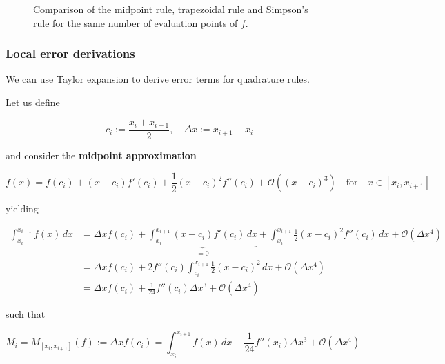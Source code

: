 \begin{figure}[!htb]
 \centering
 \hfill
 \caption{Comparison of the midpoint rule, trapezoidal rule and Simpson's rule for the same number 
 of evaluation points of $f$.}
 \label{fig:quadrature_comparison}
\end{figure}

\subsubsection{Local error derivations}

We can use Taylor expansion to derive error terms for quadrature rules.

Let us define

\begin{equation}
    c_i := \frac{x_{i} + x_{i+1}}{2}, \quad \Delta x := x_{i+1} - x_i
\end{equation}

and consider the \textbf{midpoint approximation}

\begin{equation}
    f(x) = f\left( c_i \right) + (x-c_i) f'(c_i) + \frac{1}{2}(x-c_i)^2 f''(c_i) + \mathcal{O}((x-c_i)^3) \quad \text{for} \quad x \in [x_i, x_{i+1}]
\end{equation}

yielding

\begin{equation}
    \begin{aligned}
        \int_{x_i}^{x_{i+1}} f(x) \, dx &= \Delta x f\left( c_i \right) + \underbrace{\int_{x_i}^{x_{i+1}} (x-c_i) f'(c_i)  \, dx}_{=0} + \int_{x_i}^{x_{i+1}} \frac{1}{2}(x-c_i)^2 f''(c_i)  \, dx + \mathcal{O}(\Delta x^4) \\
        &= \Delta x f\left( c_i \right) + 2 f''(c_i) \int_{c_i}^{x_{i+1}} \frac{1}{2}(x-c_i)^2   \, dx + \mathcal{O}(\Delta x^4) \\
        &= \Delta x f\left( c_i \right) + \frac{1}{24} f''(c_i)\Delta x^3 + \mathcal{O}(\Delta x^4)
    \end{aligned}
\end{equation}

such that

\begin{equation}
    M_i = M_{[x_i, x_{i+1}]}(f) := \Delta x f\left( c_i \right) = \int_{x_i}^{x_{i+1}} f(x) \, dx - \frac{1}{24} f''(x_i)\Delta x^3 + \mathcal{O}(\Delta x^4)
\end{equation}


